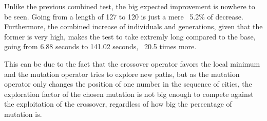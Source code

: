 Unlike the previous combined test, the big expected improvement is nowhere
to be seen. Going from a length of 127 to 120 is just a mere ~5.2\% of
decrease. Furthermore, the combined increase of individuals and
generations, given that the former is very high, makes the test to take extremly
long compared to the base, going from 6.88 seconds to 141.02 seconds, ~20.5
times more. 

This can be due to the fact that the crossover operator favors the local
minimum and the mutation operator tries to explore new paths, but as the mutation
operator only changes the position of one number in the sequence of cities,
the exploration factor of the chosen mutation is not big enough to compete
against the exploitation of the crossover, regardless of how big the
percentage of mutation is.  




